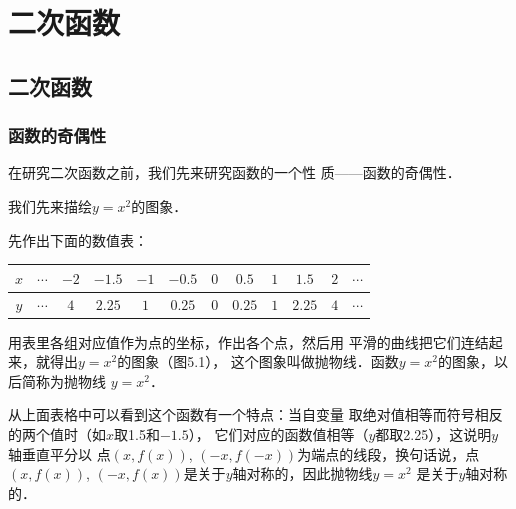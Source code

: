\chapter{二次函数}

\section{二次函数}
\subsection{函数的奇偶性}

在研究二次函数之前，我们先来研究函数的一个性
质——函数的奇偶性．

我们先来描绘$y=x^2$的图象．

先作出下面的数值表：

\begin{center}
\begin{tabular}{c|ccccccccccc}
    \hline
    $x$   &$\cdots$&   $-2$   &   $-1.5$   &   $-1$   &   $-0.5$   &   $0$   &   $0.5$   &   $1$   &   $1.5$   &   $2$   &   $\cdots$      \\
    \hline
       $y$  &$\cdots$ &   $4$   &   $2.25$   &   $1$   &   $0.25$   &   $0$   &   $0.25$   &   $1$   &   $2.25$   &   $4$   &   $\cdots$\\
       \hline
\end{tabular}
\end{center}

用表里各组对应值作为点的坐标，作出各个点，然后用
平滑的曲线把它们连结起来，就得出$y=x^2$的图象（图5.1），
这个图象叫做抛物线．函数$y=x^2$的图象，以后简称为抛物线
$y=x^2$．

\begin{figure}[htp]
    \centering
{}
    \caption{}
\end{figure}


从上面表格中可以看到这个函数有一个特点：当自变量
取绝对值相等而符号相反的两个值时（如$x$取1.5和$-1.5$），
它们对应的函数值相等（$y$都取2.25），这说明$y$轴垂直平分以
点$(x,f(x))$, $(-x,f(-x))$为端点的线段，换句话说，点
$(x,f(x))$, $(-x,f(x))$是关于$y$轴对称的，因此抛物线$y=x^2$
是关于$y$轴对称的．

